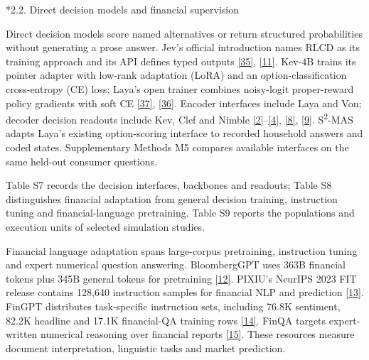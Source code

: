 \documentclass[10pt]{article}
\makeatletter
\renewcommand\subsection{\@startsection{subsection}{2}{\z@}{-1.7ex plus -.5ex minus -.2ex}{.6ex plus .2ex}{\normalfont\normalsize\mdseries}}
\makeatother
\begin{document}
\subsection*{2.2. Direct decision models and financial supervision}

Direct decision models score named alternatives or return structured probabilities without generating a prose answer. Jev's official introduction names RLCD as its training approach and its API defines typed outputs \href{https://typesafe.ai/blog/introducing-system-one-models-and-jev}{[35]}, \href{https://docs.typesafe.ai/introduction}{[11]}. Kev-4B trains its pointer adapter with low-rank adaptation (LoRA) and an option-classification cross-entropy (CE) loss; Laya's open trainer combines noisy-logit proper-reward policy gradients with soft CE \href{https://raw.githubusercontent.com/jaredpalmer/kev/main/docs/model-cards/kev-4b.md}{[37]}, \href{https://github.com/NandhaKishorM/laya/blob/main/laya/train.py}{[36]}. Encoder interfaces include Laya and Von; decoder decision readouts include Kev, Clef and Nimble \href{https://github.com/LeonaDavinci/laya-system-one}{[2]}--\href{https://github.com/jaredpalmer/kev}{[4]}, \href{https://blog.cloudflare.com/clef-decision-models/}{[8]}, \href{https://github.com/bespokelabsai/nimble}{[9]}. S\textsuperscript{2}-MAS adapts Laya's existing option-scoring interface to recorded household answers and coded states. Supplementary Methods M5 compares available interfaces on the same held-out consumer questions.

Table S7 records the decision interfaces, backbones and readouts; Table S8 distinguishes financial adaptation from general decision training, instruction tuning and financial-language pretraining. Table S9 reports the populations and execution units of selected simulation studies.

Financial language adaptation spans large-corpus pretraining, instruction tuning and expert numerical question answering. BloombergGPT uses 363B financial tokens plus 345B general tokens for pretraining \href{https://arxiv.org/abs/2303.17564}{[12]}. PIXIU's NeurIPS 2023 FIT release contains 128,640 instruction samples for financial NLP and prediction \href{https://proceedings.nips.cc/paper\_files/paper/2023/file/6a386d703b50f1cf1f61ab02a15967bb-Paper-Datasets\_and\_Benchmarks.pdf}{[13]}. FinGPT distributes task-specific instruction sets, including 76.8K sentiment, 82.2K headline and 17.1K financial-QA training rows \href{https://github.com/AI4Finance-Foundation/FinGPT}{[14]}. FinQA targets expert-written numerical reasoning over financial reports \href{https://aclanthology.org/2021.emnlp-main.300/}{[15]}. These resources measure document interpretation, linguistic tasks and market prediction.
\end{document}
